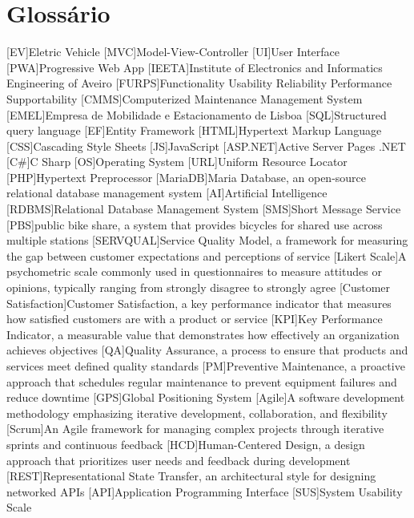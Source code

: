 \chapter{Glossário}

\footnotesize
\SingleSpacing

\begin{multicols}{2}
\begin{acronym}[AAAAAA]

	[EV]{Eletric Vehicle}
	[MVC]{Model-View-Controller}
	[UI]{User Interface}
	[PWA]{Progressive Web App}
	[IEETA]{Institute of Electronics and Informatics Engineering of Aveiro}
	[FURPS]{Functionality Usability Reliability Performance Supportability}
	[CMMS]{Computerized Maintenance Management System}
	[EMEL]{Empresa de Mobilidade e Estacionamento de Lisboa}
	[SQL]{Structured query language}
	[EF]{Entity Framework}
	[HTML]{Hypertext Markup Language}
	[CSS]{Cascading Style Sheets}
	[JS]{JavaScript}
	[ASP.NET]{Active Server Pages .NET}
	[C\#]{C Sharp}
	[OS]{Operating System}
	[URL]{Uniform Resource Locator}
	[PHP]{Hypertext Preprocessor}
	[MariaDB]{Maria Database, an open-source relational database management system}
	[AI]{Artificial Intelligence}
	[RDBMS]{Relational Database Management System}
	[SMS]{Short Message Service}
	[PBS]{public bike share, a system that provides bicycles for shared use across multiple stations}
	[SERVQUAL]{Service Quality Model, a framework for measuring the gap between customer expectations and perceptions of service}
	[Likert Scale]{A psychometric scale commonly used in questionnaires to measure attitudes or opinions, typically ranging from strongly disagree to strongly agree}
	[Customer Satisfaction]{Customer Satisfaction, a key performance indicator that measures how satisfied customers are with a product or service}
	[KPI]{Key Performance Indicator, a measurable value that demonstrates how effectively an organization achieves objectives}
	[QA]{Quality Assurance, a process to ensure that products and services meet defined quality standards}
	[PM]{Preventive Maintenance, a proactive approach that schedules regular maintenance to prevent equipment failures and reduce downtime}
	[GPS]{Global Positioning System}
	[Agile]{A software development methodology emphasizing iterative development, collaboration, and flexibility}
	[Scrum]{An Agile framework for managing complex projects through iterative sprints and continuous feedback}
	[HCD]{Human-Centered Design, a design approach that prioritizes user needs and feedback during development}
	[REST]{Representational State Transfer, an architectural style for designing networked APIs}
	[API]{Application Programming Interface}
	[SUS]{System Usability Scale}


\end{acronym}
\end{multicols}
